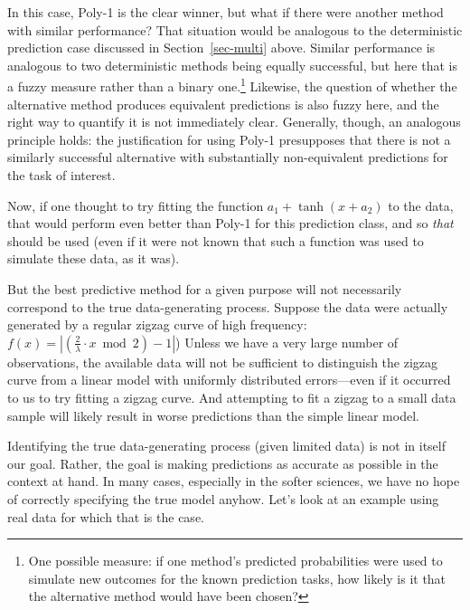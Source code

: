 \documentclass[
  letterpaper,
  DIV=11,
  numbers=noendperiod]{scrartcl}
\theoremstyle{definition}
\theoremstyle{remark}
\begin{document}
In this case, Poly-1 is the clear winner, but what if there were another
method with similar performance? That situation would be analogous to
the deterministic prediction case discussed in Section~\ref{sec-multi}
above. Similar performance is analogous to two deterministic methods
being equally successful, but here that is a fuzzy measure rather than a
binary one.\footnote{One possible measure: if one method's predicted
  probabilities were used to simulate new outcomes for the known
  prediction tasks, how likely is it that the alternative method would
  have been chosen?} Likewise, the question of whether the alternative
method produces equivalent predictions is also fuzzy here, and the right
way to quantify it is not immediately clear. Generally, though, an
analogous principle holds: the justification for using Poly-1
presupposes that there is not a similarly successful alternative with
substantially non-equivalent predictions for the task of interest.

Now, if one thought to try fitting the function
\(a_1 + \tanh (x + a_2)\) to the data, that would perform even better
than Poly-1 for this prediction class, and so \emph{that} should be used
(even if it were not known that such a function was used to simulate
these data, as it was).

But the best predictive method for a given purpose will not necessarily
correspond to the true data-generating process. Suppose the data were
actually generated by a regular zigzag curve of high frequency:
\(f(x) = \left| \left( \frac{2}{\lambda} \cdot x \bmod 2 \right) - 1 \right|\))
Unless we have a very large number of observations, the available data
will not be sufficient to distinguish the zigzag curve from a linear
model with uniformly distributed errors---even if it occurred to us to
try fitting a zigzag curve. And attempting to fit a zigzag to a small
data sample will likely result in worse predictions than the simple
linear model.

Identifying the true data-generating process (given limited data) is not
in itself our goal. Rather, the goal is making predictions as accurate
as possible in the context at hand. In many cases, especially in the
softer sciences, we have no hope of correctly specifying the true model
anyhow. Let's look at an example using real data for which that is the
case.
\end{document}
